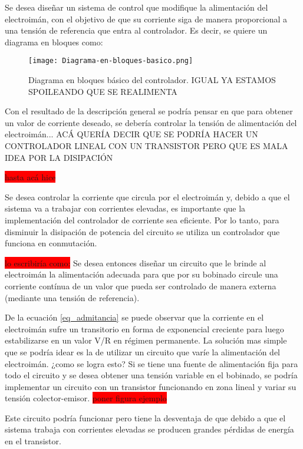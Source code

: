 Se desea diseñar un sistema de control que modifique la alimentación del electroimán, con el objetivo de que su corriente siga de manera proporcional a una tensión de referencia que entra al controlador. Es decir, se quiere un diagrama en bloques como: 

\begin{figure}[H]
	\centering
	\texttt{[image: Diagrama-en-bloques-basico.png]}
	\caption{Diagrama en bloques básico del controlador. IGUAL YA ESTAMOS SPOILEANDO QUE SE REALIMENTA}
	\label{fig:img_diagrama_bloques_basico}
\end{figure}





Con el resultado de la descripción general se podría pensar en que para obtener un valor de corriente deseado, se debería controlar la tensión de alimentación del electroimán... ACÁ QUERÍA DECIR QUE SE PODRÍA HACER UN CONTROLADOR LINEAL CON UN TRANSISTOR PERO QUE ES MALA IDEA POR LA DISIPACIÓN 



\colorbox{red}{hasta acá hice}

\noindent Se desea controlar la corriente que circula por el electroimán y, debido a que el sistema va a trabajar con corrientes elevadas, es importante que la implementación del controlador de corriente sea eficiente. Por lo tanto, para disminuir la disipación de potencia del circuito se utiliza un controlador que funciona en conmutación.

\colorbox{red}{lo escribiría como:}
Se desea entonces diseñar un circuito que le brinde al electroimán la alimentación adecuada para que por su bobinado circule una corriente contínua de un valor que pueda ser controlado de manera externa (mediante una tensión de referencia).

De la ecuación \ref{eq_admitancia} se puede observar que la corriente en el electroimán sufre un transitorio en forma de exponencial creciente para luego estabilizarse en un valor V/R en régimen permanente. La solución mas simple que se podría idear es la de utilizar un circuito que varíe la alimentación del electroimán. ¿como se logra esto? Si se tiene una fuente de alimentación fija para todo el circuito y se desea obtener una tensión variable en el bobinado, se podría implementar un circuito con un transistor funcionando en zona lineal y variar su tensión colector-emisor. \colorbox{red}{poner figura ejemplo}

Este circuito podría funcionar pero tiene la desventaja de que debido a que el sistema trabaja con corrientes elevadas se producen grandes pérdidas de energía en el transistor. 

